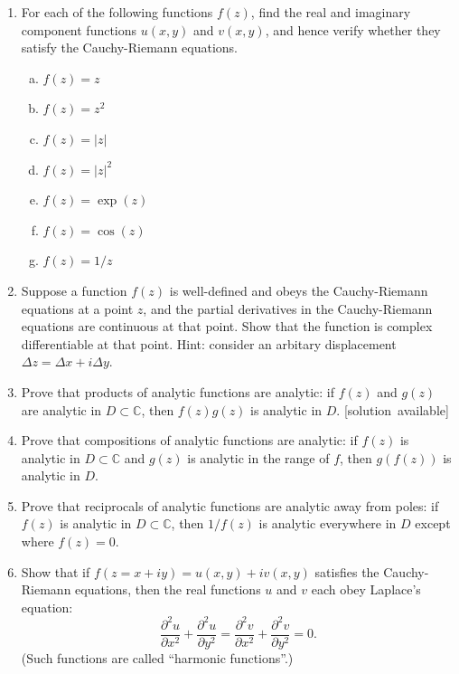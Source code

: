 \documentclass[10pt,a4paper]{article}
\begin{document}
\begin{enumerate}
\item
  For each of the following functions $f(z)$, find the real and
  imaginary component functions $u(x,y)$ and $v(x,y)$, and hence
  verify whether they satisfy the Cauchy-Riemann equations.

  \begin{enumerate}[(a)]
  \item $f(z) = z$
  \item $f(z) = z^2$
  \item $f(z) = |z|$
  \item $f(z) = |z|^2$
  \item $f(z) = \exp(z)$
  \item $f(z) = \cos(z)$
  \item $f(z) = 1/z$
  \end{enumerate}

\item
  Suppose a function $f(z)$ is well-defined and obeys the
  Cauchy-Riemann equations at a point $z$, and the partial derivatives
  in the Cauchy-Riemann equations are continuous at that point. Show
  that the function is complex differentiable at that point. Hint:
  consider an arbitary displacement
  $\Delta z = \Delta x + i \Delta y$.

\item
  Prove that products of analytic functions are analytic: if $f(z)$
  and $g(z)$ are analytic in $D \subset \mathbb{C}$, then
  $f(z) g(z)$ is analytic in $D$.
  \hfill{\scriptsize [solution~available]}

\item
  Prove that compositions of analytic functions are analytic: if
  $f(z)$ is analytic in $D \subset \mathbb{C}$ and $g(z)$ is
  analytic in the range of $f$, then $g(f(z))$ is analytic in $D$.

\item
  Prove that reciprocals of analytic functions are analytic away from
  poles: if $f(z)$ is analytic in $D \subset \mathbb{C}$, then
  $1/f(z)$ is analytic everywhere in $D$ except where $f(z) = 0$.

\item
  Show that if $f(z = x + iy) = u(x,y) + i v(x,y)$ satisfies the
  Cauchy-Riemann equations, then the real functions $u$ and $v$ each
  obey Laplace's equation:
  \begin{equation}
    \frac{\partial^2 u}{\partial x^2} + \frac{\partial^2u}{\partial y^2} = \frac{\partial^2 v}{\partial x^2} + \frac{\partial^2 v}{\partial y^2} = 0.
  \end{equation}
  (Such functions are called ``harmonic functions''.)


\end{enumerate}
\end{document}
